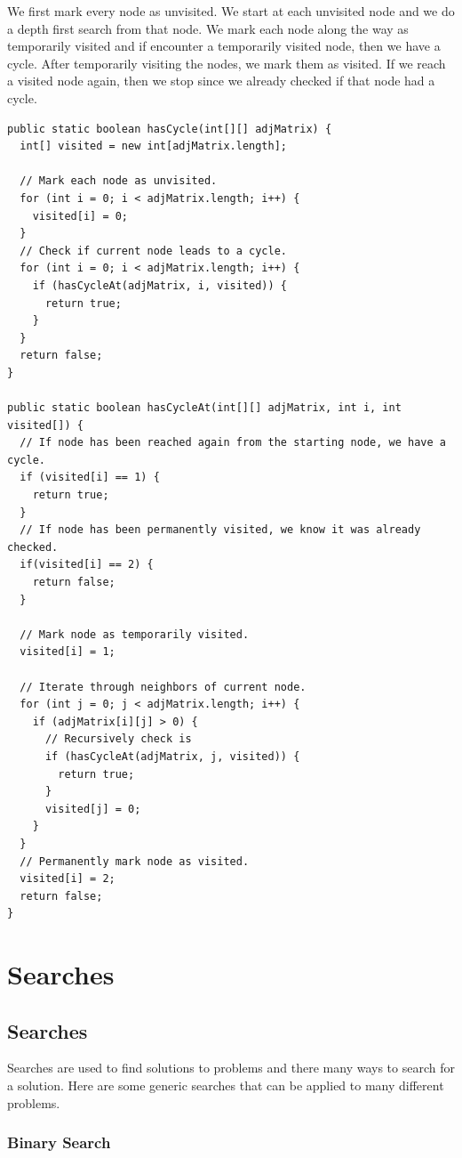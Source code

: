 \documentclass[11pt,oneside]{book}
\begin{document}
We first mark every node as unvisited. We start at each unvisited node and we do a depth first search from that node. We mark each node along the way as temporarily visited and if encounter a temporarily visited node, then we have a cycle. After temporarily visiting the nodes, we mark them as visited. If we reach a visited node again, then we stop since we already checked if that node had a cycle.

\begin{lstlisting}
public static boolean hasCycle(int[][] adjMatrix) {
  int[] visited = new int[adjMatrix.length];
  
  // Mark each node as unvisited.
  for (int i = 0; i < adjMatrix.length; i++) {
    visited[i] = 0;
  }
  // Check if current node leads to a cycle.
  for (int i = 0; i < adjMatrix.length; i++) {
    if (hasCycleAt(adjMatrix, i, visited)) {
      return true;
    }
  }
  return false;
}

public static boolean hasCycleAt(int[][] adjMatrix, int i, int visited[]) {
  // If node has been reached again from the starting node, we have a cycle.
  if (visited[i] == 1) {
    return true;
  }
  // If node has been permanently visited, we know it was already checked.
  if(visited[i] == 2) {
    return false;
  }
  
  // Mark node as temporarily visited.
  visited[i] = 1;
  
  // Iterate through neighbors of current node.
  for (int j = 0; j < adjMatrix.length; i++) {
    if (adjMatrix[i][j] > 0) {
      // Recursively check is 
      if (hasCycleAt(adjMatrix, j, visited)) {
        return true;
      }
      visited[j] = 0;
    }
  }
  // Permanently mark node as visited.
  visited[i] = 2;
  return false;
}
\end{lstlisting}

\part{ Searches }
    \chapter{ Searches }
        

Searches are used to find solutions to problems and there many ways to search for a solution. Here are some generic searches that can be applied to many different problems.


        \section{ Binary Search }
        
\end{document}
